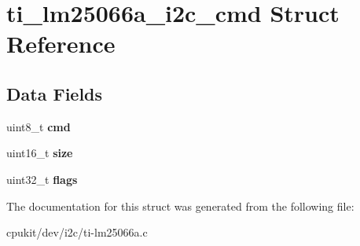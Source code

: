\hypertarget{structti__lm25066a__i2c__cmd}{}\section{ti\+\_\+lm25066a\+\_\+i2c\+\_\+cmd Struct Reference}
\label{structti__lm25066a__i2c__cmd}
\subsection*{Data Fields}
\begin{DoxyCompactItemize}
\item 
\mbox{\label{structti__lm25066a__i2c__cmd_aa410d70ae3463cc78c577521a557b7ef}} 
uint8\+\_\+t {\bfseries cmd}
\item 
\mbox{\label{structti__lm25066a__i2c__cmd_a4133e97e2b31af2bdad65cd043577a9c}} 
uint16\+\_\+t {\bfseries size}
\item 
\mbox{\label{structti__lm25066a__i2c__cmd_a0d17ffe43c64f76207133e7a9d395e28}} 
uint32\+\_\+t {\bfseries flags}
\end{DoxyCompactItemize}


The documentation for this struct was generated from the following file\+:\begin{DoxyCompactItemize}
\item 
cpukit/dev/i2c/ti-\/lm25066a.\+c\end{DoxyCompactItemize}
